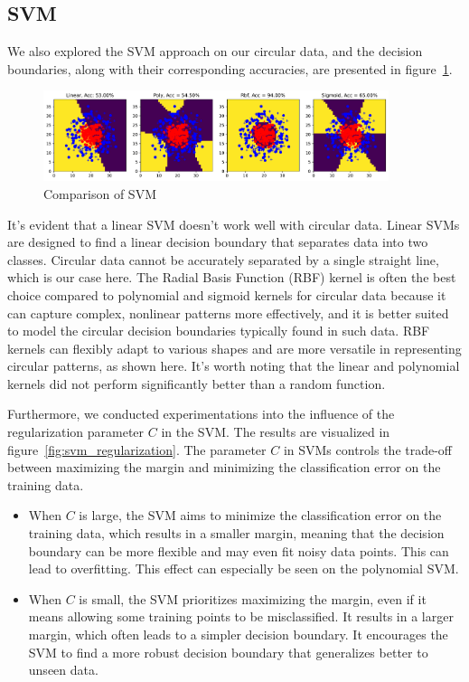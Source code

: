 \subsection{SVM}

We also explored the SVM approach on our circular data, and the decision boundaries, along with their corresponding accuracies, are presented in figure~\ref{fig:svm_comparison}.

\begin{figure}[H]
    \centering
    \includegraphics[width=0.9\textwidth]{figs/NN/svm_comparison.pdf}
    \caption{Comparison of SVM}
    \label{fig:svm_comparison}
\end{figure}

It's evident that a linear SVM doesn't work well with circular data. Linear SVMs are designed to find a linear decision boundary that separates data into two classes. Circular data cannot be accurately separated by a single straight line, which is our case here. The Radial Basis Function (RBF) kernel is often the best choice compared to polynomial and sigmoid kernels for circular data because it can capture complex, nonlinear patterns more effectively, and it is better suited to model the circular decision boundaries typically found in such data. RBF kernels can flexibly adapt to various shapes and are more versatile in representing circular patterns, as shown here. It's worth noting that the linear and polynomial kernels did not perform significantly better than a random function.

Furthermore, we conducted experimentations into the influence of the regularization parameter $C$ in the SVM. The results are visualized in figure~\ref{fig:svm_regularization}. The parameter $C$ in SVMs controls the trade-off between maximizing the margin and minimizing the classification error on the training data.

\begin{itemize}
    \item When $C$ is large, the SVM aims to minimize the classification error on the training data, which results in a smaller margin, meaning that the decision boundary can be more flexible and may even fit noisy data points. This can lead to overfitting. This effect can especially be seen on the polynomial SVM. 
    \item When $C$ is small, the SVM prioritizes maximizing the margin, even if it means allowing some training points to be misclassified. It results in a larger margin, which often leads to a simpler decision boundary. It encourages the SVM to find a more robust decision boundary that generalizes better to unseen data.
\end{itemize}

